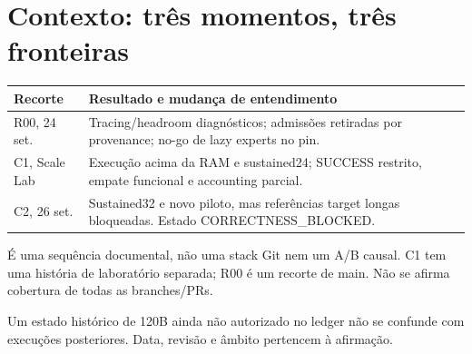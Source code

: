 \section{Contexto: três momentos, três fronteiras}
\begin{tabularx}{\linewidth}{@{}p{28mm}Y@{}}
\toprule \textbf{Recorte} & \textbf{Resultado e mudança de entendimento}\\ \midrule
R00, 24 set. & Tracing/headroom diagnósticos; admissões retiradas por provenance; no-go de lazy experts no pin.\\
C1, Scale Lab & Execução acima da RAM e sustained24; SUCCESS restrito, empate funcional e accounting parcial.\\
C2, 26 set. & Sustained32 e novo piloto, mas referências target longas bloqueadas. Estado CORRECTNESS\_BLOCKED.\\
\bottomrule
\end{tabularx}
  

É uma sequência documental, não uma stack Git nem um A/B causal. C1 tem uma história de laboratório separada; R00 é um recorte de main. Não se afirma cobertura de todas as branches/PRs.

Um estado histórico de 120B ainda não autorizado no ledger não se confunde com execuções posteriores. Data, revisão e âmbito pertencem à afirmação.
